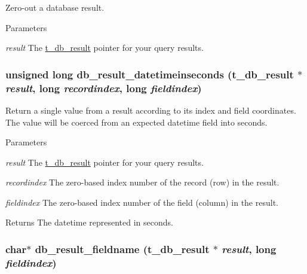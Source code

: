 Zero-\/out a database result. 
\begin{DoxyParams}{Parameters}
\item[{\em result}]The \hyperlink{group__database_gae34db00cb98960e94b5ca58a7c21c362}{t\_\-db\_\-result} pointer for your query results. \end{DoxyParams}
\hypertarget{group__database_ga16ce6b68722eb623d9207b630e55b09a}{
\subsubsection[{db\_\-result\_\-datetimeinseconds}]{\setlength{\rightskip}{0pt plus 5cm}unsigned long db\_\-result\_\-datetimeinseconds ({\bf t\_\-db\_\-result} $\ast$ {\em result}, \/  long {\em recordindex}, \/  long {\em fieldindex})}}
\label{group__database_ga16ce6b68722eb623d9207b630e55b09a}


Return a single value from a result according to its index and field coordinates. The value will be coerced from an expected datetime field into seconds.


\begin{DoxyParams}{Parameters}
\item[{\em result}]The \hyperlink{group__database_gae34db00cb98960e94b5ca58a7c21c362}{t\_\-db\_\-result} pointer for your query results. \item[{\em recordindex}]The zero-\/based index number of the record (row) in the result. \item[{\em fieldindex}]The zero-\/based index number of the field (column) in the result. \end{DoxyParams}
\begin{DoxyReturn}{Returns}
The datetime represented in seconds. 
\end{DoxyReturn}
\hypertarget{group__database_ga7a9cc6a72ef3730979d0d909421076b3}{
\subsubsection[{db\_\-result\_\-fieldname}]{\setlength{\rightskip}{0pt plus 5cm}char$\ast$ db\_\-result\_\-fieldname ({\bf t\_\-db\_\-result} $\ast$ {\em result}, \/  long {\em fieldindex})}}
\label{group__database_ga7a9cc6a72ef3730979d0d909421076b3}


